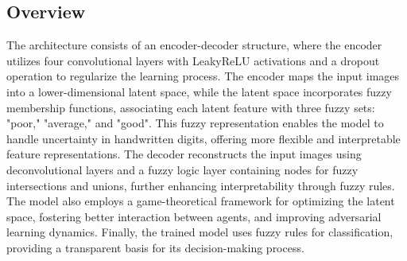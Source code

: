 \documentclass[9pt,a4paper,twoside]{rho-class/rho}
\begin{document}
    \subsection{Overview}
    The architecture consists of an encoder-decoder structure, where the encoder utilizes four convolutional layers with LeakyReLU activations and a dropout operation to regularize the learning process. The encoder maps the input images into a lower-dimensional latent space, while the latent space incorporates fuzzy membership functions, associating each latent feature with three fuzzy sets: "poor," "average," and "good". This fuzzy representation enables the model to handle uncertainty in handwritten digits, offering more flexible and interpretable feature representations. The decoder reconstructs the input images using deconvolutional layers and a fuzzy logic layer containing nodes for fuzzy intersections and unions, further enhancing interpretability through fuzzy rules. The model also employs a game-theoretical framework for optimizing the latent space, fostering better interaction between agents, and improving adversarial learning dynamics. Finally, the trained model uses fuzzy rules for classification, providing a transparent basis for its decision-making process.
    
\end{document}
